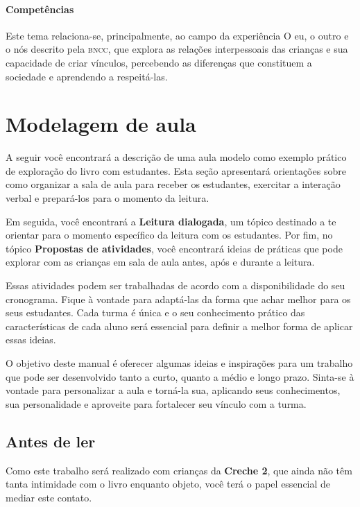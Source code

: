 \documentclass[11pt]{extarticle}
\begin{document}
\paragraph{Competências} Este tema relaciona-se, principalmente, ao 
campo da experiência O eu, o outro e o nós 
descrito pela \textsc{bncc}, que explora as relações interpessoais das crianças e sua capacidade de criar vínculos, percebendo as diferenças que constituem a sociedade e aprendendo a respeitá-las.


\section{Modelagem de aula}
A seguir você encontrará a descrição de uma aula modelo como exemplo 
prático de exploração do livro com estudantes. Esta seção apresentará 
orientações sobre como organizar a sala de aula para receber os 
estudantes, exercitar a interação verbal e prepará-los para o 
momento da leitura.

Em seguida, você encontrará a \textbf{Leitura dialogada}, um 
tópico destinado a te orientar para o momento específico da 
leitura com os estudantes. Por fim, no tópico 
\textbf{Propostas de atividades}, você encontrará ideias 
de práticas que pode explorar com as crianças em sala de 
aula antes, após e durante a leitura. 

Essas atividades podem ser trabalhadas de acordo com a 
disponibilidade do seu cronograma. Fique à vontade para adaptá-las 
da forma que achar melhor para os seus estudantes. Cada turma é única 
e o seu conhecimento prático das características de cada aluno será 
essencial para definir a melhor forma de aplicar essas ideias. 

O objetivo deste manual é oferecer algumas ideias 
e inspirações para um trabalho que pode ser desenvolvido tanto 
a curto, quanto a médio e longo prazo. Sinta-se à vontade para 
personalizar a aula e torná-la sua, aplicando seus conhecimentos, sua 
personalidade e aproveite para fortalecer 
seu vínculo com a turma.


\subsection{Antes de ler}


Como este trabalho será realizado com crianças da \textbf{Creche 2}, 
que ainda não têm tanta intimidade com o livro enquanto objeto, você terá o 
papel essencial de mediar este contato. 
\end{document}
